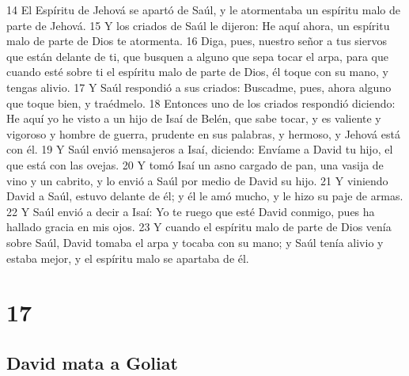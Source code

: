 14 El Espíritu de Jehová se apartó de Saúl, y le atormentaba un espíritu malo de parte de Jehová.
15 Y los criados de Saúl le dijeron: He aquí ahora, un espíritu malo de parte de Dios te atormenta.
16 Diga, pues, nuestro señor a tus siervos que están delante de ti, que busquen a alguno que sepa tocar el arpa, para que cuando esté sobre ti el espíritu malo de parte de Dios, él toque con su mano, y tengas alivio.
17 Y Saúl respondió a sus criados: Buscadme, pues, ahora alguno que toque bien, y traédmelo.
18 Entonces uno de los criados respondió diciendo: He aquí yo he visto a un hijo de Isaí de Belén, que sabe tocar, y es valiente y vigoroso y hombre de guerra, prudente en sus palabras, y hermoso, y Jehová está con él.
19 Y Saúl envió mensajeros a Isaí, diciendo: Envíame a David tu hijo, el que está con las ovejas.
20 Y tomó Isaí un asno cargado de pan, una vasija de vino y un cabrito, y lo envió a Saúl por medio de David su hijo.
21 Y viniendo David a Saúl, estuvo delante de él; y él le amó mucho, y le hizo su paje de armas.
22 Y Saúl envió a decir a Isaí: Yo te ruego que esté David conmigo, pues ha hallado gracia en mis ojos.
23 Y cuando el espíritu malo de parte de Dios venía sobre Saúl, David tomaba el arpa y tocaba con su mano; y Saúl tenía alivio y estaba mejor, y el espíritu malo se apartaba de él.

\chapter{17}

\section*{David mata a Goliat}


